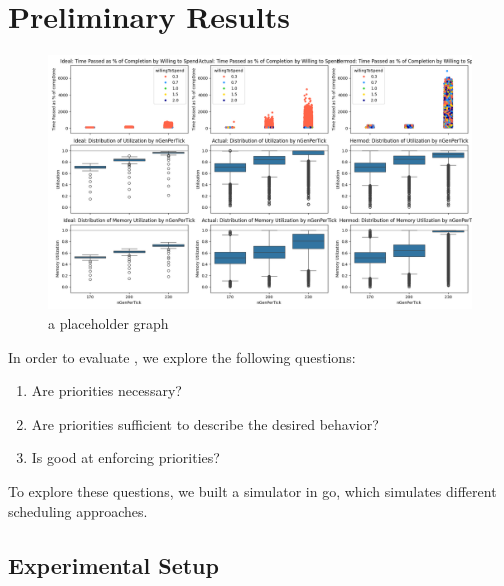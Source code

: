 \section{Preliminary Results}

\begin{figure}[t!]
    \centering
      \includegraphics[width=15cm]{img/combined_res.png}
      \caption{ a placeholder graph }
    \label{fig:graph}
\end{figure}



In order to evaluate \sys{}, we explore the following questions: 
\begin{enumerate}
    \item Are priorities necessary?
    \item Are priorities sufficient to describe the desired behavior?
    \item Is \sys{} good at enforcing priorities?
\end{enumerate}


To explore these questions, we built a simulator in go\cite{TODO}, which
simulates different scheduling approaches.


\subsection{Experimental Setup}

